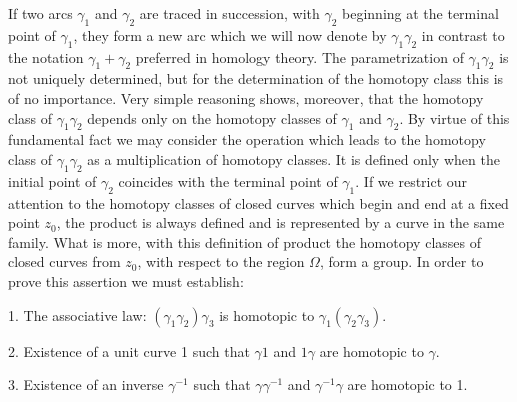 If two arcs $\gamma_{1}$ and $\gamma_{2}$ are traced in succession, with $\gamma_{2}$ beginning at the terminal point of $\gamma_{1}$, they form a new arc which we will now denote by $\gamma_{1}\gamma_{2}$ in contrast to the notation $\gamma_{1} + \gamma_{2}$ preferred in homology theory. The parametrization of $\gamma_{1}\gamma_{2}$ is not uniquely determined, but for the determination of the homotopy class this is of no importance. Very simple reasoning shows, moreover, that the homotopy class of $\gamma_{1}\gamma_{2}$ depends only on the homotopy classes of $\gamma_{1}$ and $\gamma_{2}$. By virtue of this fundamental fact we may consider the operation which leads to the homotopy class of $\gamma_{1}\gamma_{2}$ as a multiplication of homotopy classes. It is defined only when the initial point of $\gamma_{2}$ coincides with the terminal point of $\gamma_{1}$. If we restrict our attention to the homotopy classes of closed curves which begin and end at a fixed point $z_{0}$, the product is always defined and is represented by a curve in the same family. What is more, with this definition of product the homotopy classes of closed curves from $z_{0}$, with respect to the region $\Omega$, form a group. In order to prove this assertion we must establish:

1. The associative law: $(\gamma_{1}\gamma_{2})\gamma_{3}$ is homotopic to $\gamma_{1}(\gamma_{2}\gamma_{3})$.

2. Existence of a unit curve 1 such that $\gamma 1$ and $1\gamma$ are homotopic to $\gamma$.

3. Existence of an inverse $\gamma^{-1}$ such that $\gamma\gamma^{-1}$ and $\gamma^{-1}\gamma$ are homotopic to 1.

